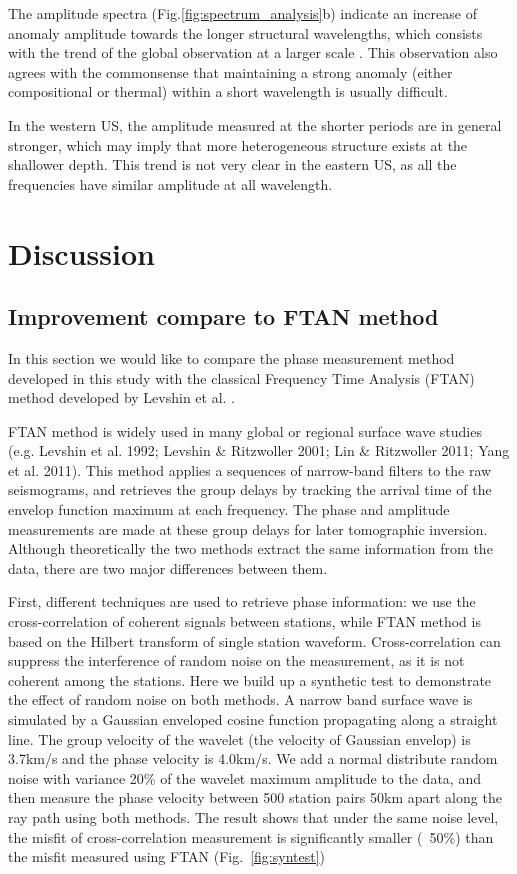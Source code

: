 \documentclass[referee]{gji}
\begin{document}
The amplitude spectra (Fig.\ref{fig:spectrum_analysis}b) indicate an increase of anomaly amplitude towards the longer structural wavelengths, which consists with the trend of the global observation at a larger scale \cite{Dziewonski:2010ma}. This observation also agrees with the commonsense that maintaining a strong anomaly (either compositional or thermal) within a short wavelength is usually difficult. 

In the western US, the amplitude measured at the shorter periods are in general stronger, which may imply that more heterogeneous structure exists at the shallower depth. This trend is not very clear in the eastern US, as all the frequencies have similar amplitude at all wavelength. 

\section{Discussion}

\subsection{Improvement compare to FTAN method}

In this section we would like to compare the phase measurement method developed in this study with the classical Frequency Time Analysis (FTAN) method developed by Levshin et al. . 

FTAN method is widely used in many global or regional surface wave studies (e.g. Levshin et al. 1992; Levshin \& Ritzwoller 2001; Lin \& Ritzwoller 2011; Yang et al. 2011). This method applies a sequences of narrow-band filters to the raw seismograms, and retrieves the group delays by tracking the arrival time of the envelop function maximum at each frequency. The phase and amplitude measurements are made at these group delays for later tomographic inversion. Although theoretically the two methods extract the same information from the data, there are two major differences between them. 

First, different techniques are used to retrieve phase information: we use the cross-correlation of coherent signals between stations, while FTAN method is based on the Hilbert transform of single station waveform. Cross-correlation can suppress the interference of random noise on the measurement, as it is not coherent among the stations. Here we build up a synthetic test to demonstrate the effect of random noise on both methods. A narrow band surface wave is simulated by a Gaussian enveloped cosine function propagating along a straight line. The group velocity of the wavelet (the velocity of Gaussian envelop) is 3.7km/s and the phase velocity is 4.0km/s. We add a normal distribute random noise with variance 20\% of the wavelet maximum amplitude to the data, and then measure the phase velocity between 500 station pairs 50km apart along the ray path using both methods. The result shows that under the same noise level, the misfit of cross-correlation measurement is significantly smaller (~50\%) than the misfit measured using FTAN (Fig.~\ref{fig:syntest})
\end{document}
